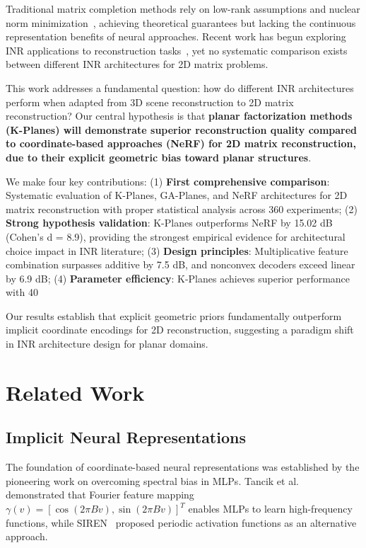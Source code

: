 \documentclass[10pt,twocolumn,letterpaper]{article}
\begin{document}
Traditional matrix completion methods rely on low-rank assumptions and nuclear norm minimization~\cite{candes2009matrix,recht2011simpler}, achieving theoretical guarantees but lacking the continuous representation benefits of neural approaches. Recent work has begun exploring INR applications to reconstruction tasks~\cite{zhang2025lorein,shi2024inr}, yet no systematic comparison exists between different INR architectures for 2D matrix problems.

This work addresses a fundamental question: how do different INR architectures perform when adapted from 3D scene reconstruction to 2D matrix reconstruction? Our central hypothesis is that \textbf{planar factorization methods (K-Planes) will demonstrate superior reconstruction quality compared to coordinate-based approaches (NeRF) for 2D matrix reconstruction, due to their explicit geometric bias toward planar structures}.

We make four key contributions: (1) \textbf{First comprehensive comparison}: Systematic evaluation of K-Planes, GA-Planes, and NeRF architectures for 2D matrix reconstruction with proper statistical analysis across 360 experiments; (2) \textbf{Strong hypothesis validation}: K-Planes outperforms NeRF by 15.02 dB (Cohen's d = 8.9), providing the strongest empirical evidence for architectural choice impact in INR literature; (3) \textbf{Design principles}: Multiplicative feature combination surpasses additive by 7.5 dB, and nonconvex decoders exceed linear by 6.9 dB; (4) \textbf{Parameter efficiency}: K-Planes achieves superior performance with 40%

Our results establish that explicit geometric priors fundamentally outperform implicit coordinate encodings for 2D reconstruction, suggesting a paradigm shift in INR architecture design for planar domains.

\section{Related Work}

\subsection{Implicit Neural Representations}

The foundation of coordinate-based neural representations was established by the pioneering work on overcoming spectral bias in MLPs. Tancik et al.~\cite{tancik2020fourier} demonstrated that Fourier feature mapping $\gamma(v) = [\cos(2\pi Bv), \sin(2\pi Bv)]^T$ enables MLPs to learn high-frequency functions, while SIREN~\cite{sitzmann2020siren} proposed periodic activation functions as an alternative approach.
\end{document}

